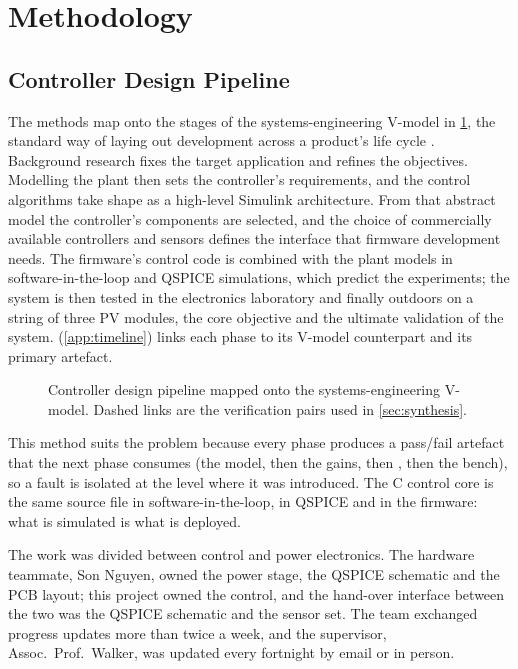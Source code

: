 \section{Methodology}
\label{sec:method}

\subsection{Controller Design Pipeline}
\label{sec:pipeline}
The methods map onto the stages of the systems-engineering V-model in \cref{fig:vmodel}, the standard way of laying out development across a product's life cycle \cite{seal_system_2018}. Background research fixes the target application and refines the objectives. Modelling the plant then sets the controller's requirements, and the control algorithms take shape as a high-level Simulink architecture. From that abstract model the controller's components are selected, and the choice of commercially available controllers and sensors defines the interface that firmware development needs. The firmware's control code is combined with the plant models in software-in-the-loop and QSPICE simulations, which predict the experiments; the system is then tested in the electronics laboratory and finally outdoors on a string of three PV modules, the core objective and the ultimate validation of the system.  (\cref{app:timeline}) links each phase to its V-model counterpart and its primary artefact.

\begin{figure}[htbp]
  \centering
  
  \caption[{Controller design pipeline mapped onto the systems-engineering V-model}]{Controller design pipeline mapped onto the systems-engineering V-model. Dashed links are the verification pairs used in \cref{sec:synthesis}.}
  \label{fig:vmodel}
\end{figure}
This method suits the problem because every phase produces a pass/fail artefact that the next phase consumes (the model, then the gains, then , then the bench), so a fault is isolated at the level where it was introduced. The C control core is the same source file in software-in-the-loop, in QSPICE and in the firmware: what is simulated is what is deployed.

The work was divided between control and power electronics. The hardware teammate, Son Nguyen, owned the power stage, the QSPICE schematic and the PCB layout; this project owned the control, and the hand-over interface between the two was the QSPICE schematic and the sensor set. The team exchanged progress updates more than twice a week, and the supervisor, Assoc.\ Prof.\ Walker, was updated every fortnight by email or in person.

